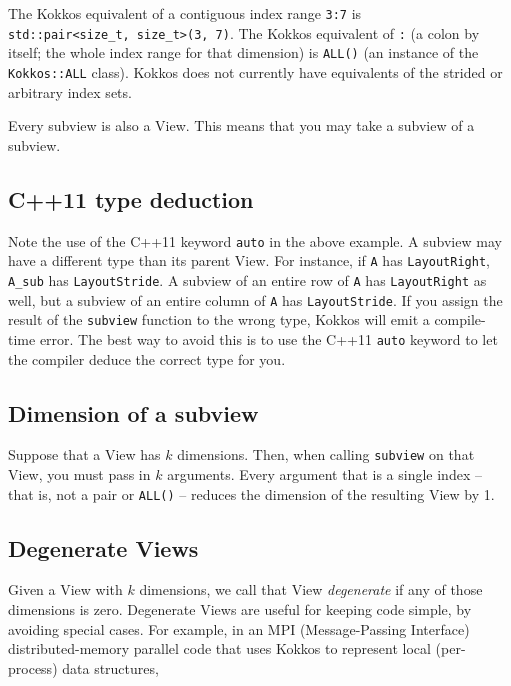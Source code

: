 The Kokkos equivalent of a contiguous index range \texttt{3:7} is
\\ \lstinline!std::pair<size_t, size_t>(3, 7)!.  The Kokkos equivalent of
\texttt{:} (a colon by itself; the whole index range for that
dimension) is \texttt{ALL()} (an instance of the \texttt{Kokkos::ALL}
class).  Kokkos does not currently have equivalents of the strided or
arbitrary index sets.

Every subview is also a View.  This means that you may take a subview
of a subview.

\subsection{C++11 type deduction}\label{SS:Subviews:How:auto}

Note the use of the C++11 keyword \texttt{auto} in the above example.
A subview may have a different type than its parent View.  For
instance, if \lstinline!A! has \lstinline!LayoutRight!,
\lstinline!A_sub!  has \lstinline!LayoutStride!.  A subview of an
entire row of \lstinline!A! has \lstinline!LayoutRight! as well, but a
subview of an entire column of \lstinline!A! has
\lstinline!LayoutStride!.  If you assign the result of the
\texttt{subview} function to the wrong type, Kokkos will emit a
compile-time error.  The best way to avoid this is to use the C++11
\texttt{auto} keyword to let the compiler deduce the correct type for
you.

\subsection{Dimension of a subview}\label{SS:Subviews:How:dim}

Suppose that a View has $k$ dimensions.  Then, when calling
\texttt{subview} on that View, you must pass in $k$ arguments.  Every
argument that is a single index -- that is, not a pair or
\lstinline!ALL()! -- reduces the dimension of the resulting View by 1.

\subsection{Degenerate Views}\label{SS:Subviews:How:degen}

Given a View with $k$ dimensions, we call that View \emph{degenerate}
if any of those dimensions is zero.  Degenerate Views are useful for
keeping code simple, by avoiding special cases.  For example, in an
MPI (Message-Passing Interface) distributed-memory parallel code that
uses Kokkos to represent local (per-process) data structures, 
